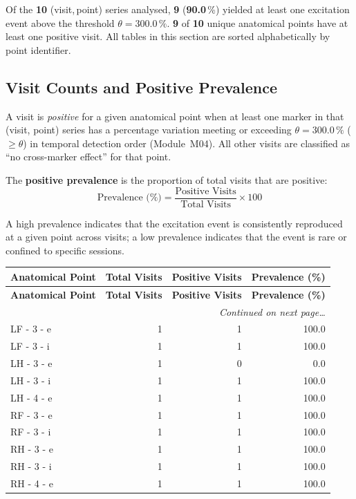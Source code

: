 \documentclass[a4paper,11pt]{article}
\begin{document}
\noindent
Of the \textbf{10} (visit,\,point) series analysed,
\textbf{9} (\textbf{90.0}\,\%) yielded at least one
excitation event above the threshold $\theta = 300.0\,\%$.
\textbf{9} of \textbf{10} unique anatomical points
have at least one positive visit.
All tables in this section are sorted alphabetically by point identifier.

\subsection{Visit Counts and Positive Prevalence}

A visit is \emph{positive} for a given anatomical point when at least one marker in that
(visit, point) series has a percentage variation meeting or exceeding
$\theta = 300.0\,\%$ ($\geq \theta$) in temporal detection order (Module~M04).
All other visits are classified as ``no cross-marker effect'' for that point.

The \textbf{positive prevalence} is the proportion of total visits that are positive:
\[
  \text{Prevalence (\%)} = \frac{\text{Positive Visits}}{\text{Total Visits}} \times 100
\]

A high prevalence indicates that the excitation event is consistently reproduced at a given
point across visits; a low prevalence indicates that the event is rare or confined to
specific sessions.

\begin{small}
\begin{longtable}{p{5cm}rrr}
\toprule
\textbf{Anatomical Point} &
\textbf{Total Visits} &
\textbf{Positive Visits} &
\textbf{Prevalence (\%)} \\
\midrule
\endfirsthead
\toprule
\textbf{Anatomical Point} &
\textbf{Total Visits} &
\textbf{Positive Visits} &
\textbf{Prevalence (\%)} \\
\midrule
\endhead
\midrule
\multicolumn{4}{r}{\small\emph{Continued on next page\ldots}} \\
\endfoot
\bottomrule
\endlastfoot
LF - 3 - e & 1 & 1 & 100.0 \\
LF - 3 - i & 1 & 1 & 100.0 \\
LH - 3 - e & 1 & 0 & 0.0 \\
LH - 3 - i & 1 & 1 & 100.0 \\
LH - 4 - e & 1 & 1 & 100.0 \\
RF - 3 - e & 1 & 1 & 100.0 \\
RF - 3 - i & 1 & 1 & 100.0 \\
RH - 3 - e & 1 & 1 & 100.0 \\
RH - 3 - i & 1 & 1 & 100.0 \\
RH - 4 - e & 1 & 1 & 100.0 \\
\end{longtable}
\end{small}
\end{document}
